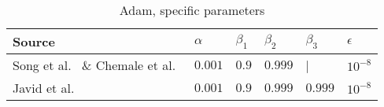 \begin{table}[htbp]
    \centering
    \caption{Adam, specific parameters}
    \label{tab:adam-params}
    \begin{tabular}{ p{6.0cm} p{1.5cm} p{1.5cm} p{1.5cm} p{1.5cm} p{1.5cm}  }
        \hline
        Source     & $\alpha$ & $\beta_1 $ & $\beta_2$ & $\beta_3$ &  $\epsilon$ \\
        \hline
        Song et al.~\cite{song_lithium-ion_2018} \& Chemale et al.~\cite{Chemali2017}
                & $0.001$ & $0.9$ & $0.999$ & |   &$10^{-8}$ \\%
        Javid et al.~\cite{javid_adaptive_2020}
                & $0.001$ & $0.9$ & $0.999$ & $0.999$ &$10^{-8}$ \\%
        \hline
    \end{tabular}
\end{table}


